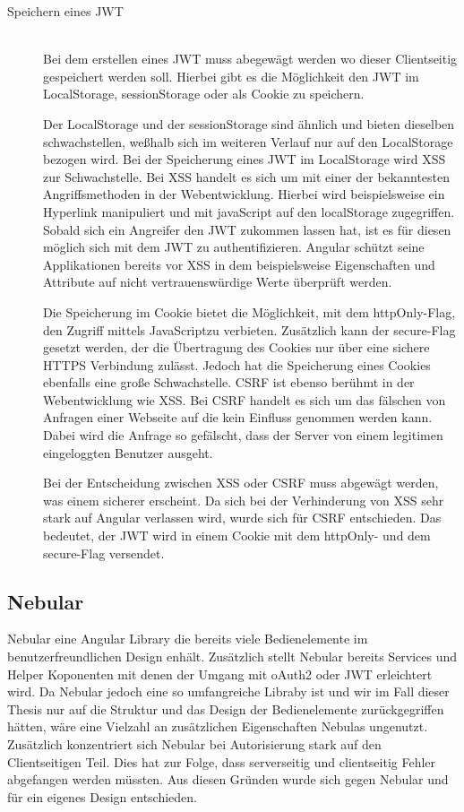 \documentclass[paper=a4,fontsize=12pt,parskip=half]{scrartcl}
\newcommand{\JS}{JavaScript}
\begin{document}
	\begin{description}
		\item[Speichern eines \gls{JWT}]\hfill\\
		Bei dem erstellen eines \gls{JWT} muss abegewägt werden wo dieser Clientseitig gespeichert werden soll. Hierbei gibt es die Möglichkeit den \gls{JWT} im LocalStorage, sessionStorage oder als Cookie zu speichern.

		Der LocalStorage und der sessionStorage sind ähnlich und bieten dieselben schwachstellen, weßhalb sich im weiteren Verlauf nur auf den LocalStorage bezogen wird. Bei der Speicherung eines \gls{JWT} im LocalStorage wird \gls{XSS} zur Schwachstelle. Bei \gls{XSS} handelt es sich um mit einer der bekanntesten Angriffsmethoden in der Webentwicklung. Hierbei wird beispielsweise ein Hyperlink manipuliert und mit javaScript auf den localStorage zugegriffen. Sobald sich ein Angreifer den \gls{JWT} zukommen lassen hat, ist es für diesen möglich sich mit dem \gls{JWT} zu authentifizieren. Angular schützt seine Applikationen bereits vor \gls{XSS} in dem beispielsweise Eigenschaften und Attribute auf nicht vertrauenswürdige Werte überprüft werden.

		Die Speicherung im Cookie bietet die Möglichkeit, mit dem httpOnly-Flag, den Zugriff mittels \JS  zu verbieten. Zusätzlich kann der secure-Flag gesetzt werden, der die Übertragung des Cookies nur über eine sichere \gls{HTTPS} Verbindung zulässt. Jedoch hat die Speicherung eines Cookies ebenfalls eine große Schwachstelle. \gls{CSRF} ist ebenso berühmt in der Webentwicklung wie \gls{XSS}. Bei \gls{CSRF} handelt es sich um das fälschen von Anfragen einer Webseite auf die kein Einfluss genommen werden kann. Dabei wird die Anfrage so gefälscht, dass der Server von einem legitimen eingeloggten Benutzer ausgeht.

		Bei der Entscheidung zwischen \gls{XSS} oder \gls{CSRF} muss abgewägt werden, was einem sicherer erscheint. Da sich bei der Verhinderung von \gls{XSS} sehr stark auf Angular verlassen wird, wurde sich für \gls{CSRF} entschieden. Das bedeutet, der \gls{JWT} wird in einem Cookie mit dem httpOnly- und dem secure-Flag versendet.
	\end{description}

	\subsection{Nebular}
	\label{sec: nebular}
	Nebular eine Angular Library die bereits viele Bedienelemente im benutzerfreundlichen Design enhält. Zusätzlich stellt Nebular bereits Services und Helper Koponenten mit denen der Umgang mit \gls{oAuth2} oder \gls{JWT} erleichtert wird. Da Nebular jedoch eine so umfangreiche Libraby ist und wir im Fall dieser Thesis nur auf die Struktur und das Design der Bedienelemente zurückgegriffen hätten, wäre eine Vielzahl an zusätzlichen Eigenschaften Nebulas ungenutzt. Zusätzlich konzentriert sich Nebular bei Autorisierung stark auf den Clientseitigen Teil. Dies hat zur Folge, dass serverseitig und clientseitig Fehler abgefangen werden müssten. Aus diesen Gründen wurde sich gegen Nebular und für ein eigenes Design entschieden.
\end{document}
